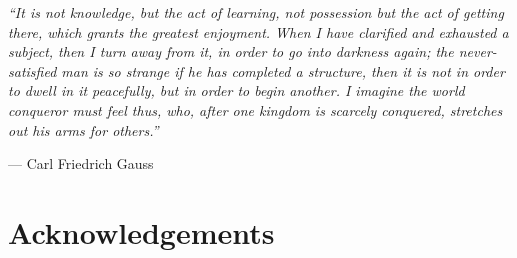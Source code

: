 
\cleardoublepage
{}
{}

\begin{flushright}
    \slshape
    ``It is not knowledge, but the act of learning, not possession but the act of getting there, which grants the greatest enjoyment. When I have clarified and exhausted a subject, then I turn away from it, in order to go into darkness again; the never-satisfied man is so strange if he has completed a structure, then it is not in order to dwell in it peacefully, but in order to begin another. I imagine the world conqueror must feel thus, who, after one kingdom is scarcely conquered, stretches out his arms for others.''
    
    \vspace{6pt}
    --- Carl Friedrich Gauss
\end{flushright}

\vspace{12pt}

\begingroup
\let\clearpage\relax
\let\cleardoublepage\relax

\chapter*{Acknowledgements}

\setlength{\emergencystretch}{2em} %

